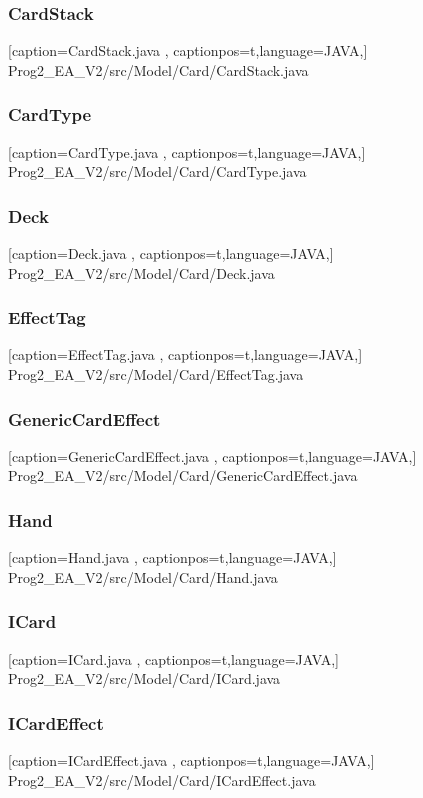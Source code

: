 \documentclass[a4paper,12pt]{scrartcl}
\begin{document}
	\subsubsection{CardStack}
	
	[caption={CardStack.java}
	\label{lst:javaclass},
	captionpos=t,language=JAVA,]
	{Prog2_EA_V2/src/Model/Card/CardStack.java}
	\subsubsection{CardType}
	
	[caption={CardType.java}
	\label{lst:javaclass},
	captionpos=t,language=JAVA,]
	{Prog2_EA_V2/src/Model/Card/CardType.java}
	\subsubsection{Deck}
	
	[caption={Deck.java}
	\label{lst:javaclass},
	captionpos=t,language=JAVA,]
	{Prog2_EA_V2/src/Model/Card/Deck.java}
	\subsubsection{EffectTag}
	
	[caption={EffectTag.java}
	\label{lst:javaclass},
	captionpos=t,language=JAVA,]
	{Prog2_EA_V2/src/Model/Card/EffectTag.java}
	\subsubsection{GenericCardEffect}
	
	[caption={GenericCardEffect.java}
	\label{lst:javaclass},
	captionpos=t,language=JAVA,]
	{Prog2_EA_V2/src/Model/Card/GenericCardEffect.java}
	\subsubsection{Hand}
	
	[caption={Hand.java}
	\label{lst:javaclass},
	captionpos=t,language=JAVA,]
	{Prog2_EA_V2/src/Model/Card/Hand.java}
	\subsubsection{ICard}
	
	[caption={ICard.java}
	\label{lst:javaclass},
	captionpos=t,language=JAVA,]
	{Prog2_EA_V2/src/Model/Card/ICard.java}
	\subsubsection{ICardEffect}
	
	[caption={ICardEffect.java}
	\label{lst:javaclass},
	captionpos=t,language=JAVA,]
	{Prog2_EA_V2/src/Model/Card/ICardEffect.java}
\end{document}
